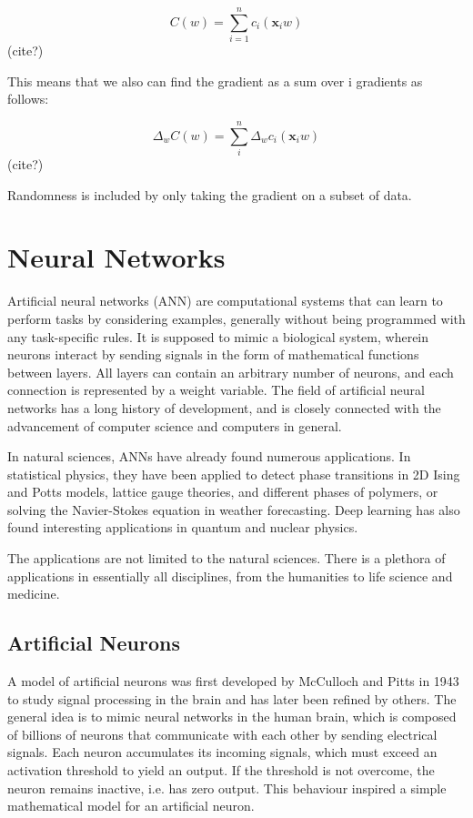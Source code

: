 \begin{equation}
	C(w) = \sum\limits_{i=1}^n c_i (\mathbf{x}_iw)
\end{equation} (cite?)

This means that we also can find the gradient as a sum over i gradients
as follows:

\begin{equation}
	\Delta_{w} C(w) = \sum\limits_{i}^n \Delta_{w}c_i (\mathbf{x}_iw)
\end{equation} (cite?)

Randomness is included by only taking the gradient on a subset of data.

\section{Neural Networks}
Artificial neural networks (ANN) are computational systems that can learn to
perform tasks by considering examples, generally without being
programmed with any task-specific rules. It is supposed to mimic a
biological system, wherein neurons interact by sending signals in the
form of mathematical functions between layers. All layers can contain
an arbitrary number of neurons, and each connection is represented by
a weight variable.
The field of artificial neural networks has a long history of
development, and is closely connected with the advancement of computer
science and computers in general.

In natural sciences, ANNs have already found numerous applications.
In statistical physics, they have been applied to detect
phase transitions in 2D Ising and Potts models, lattice gauge
theories, and different phases of polymers, or solving the
Navier-Stokes equation in weather forecasting.  Deep learning has also
found interesting applications in quantum and nuclear physics.

The applications are not limited to the natural sciences. There is a
plethora of applications in essentially all disciplines, from the
humanities to life science and medicine.

\subsection{Artificial Neurons}
A model of artificial neurons was first developed by McCulloch and Pitts in 1943 
\cite{McCulloch1943} to study signal
processing in the brain and has later been refined by others. The
general idea is to mimic neural networks in the human brain, which is
composed of billions of neurons that communicate with each other by
sending electrical signals.  Each neuron accumulates its incoming
signals, which must exceed an activation threshold to yield an
output. If the threshold is not overcome, the neuron remains inactive,
i.e. has zero output. This behaviour inspired a simple mathematical model for an artificial neuron.

